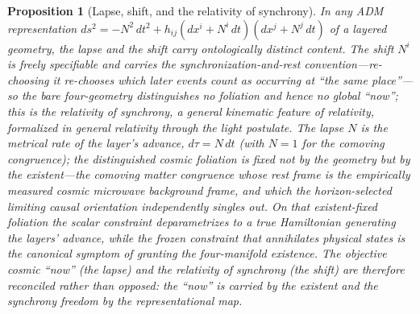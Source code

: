 \documentclass[11pt,a4paper]{article}
\theoremstyle{plain}
\newtheorem{proposition}{Proposition}
\theoremstyle{definition}
\theoremstyle{remark}
\begin{document}
\begin{proposition}[Lapse, shift, and the relativity of synchrony]
In any ADM representation $ds^2=-N^2\,dt^2+h_{ij}(dx^i+N^i\,dt)(dx^j+N^j\,dt)$ of a layered geometry, the lapse and the shift carry ontologically distinct content. The shift $N^i$ is freely specifiable and carries the synchronization-and-rest convention---re-choosing it re-chooses which later events count as occurring at ``the same place''---so the bare four-geometry distinguishes no foliation and hence no global ``now''; this is the relativity of synchrony, a general kinematic feature of relativity, formalized in general relativity through the light postulate. The lapse $N$ is the metrical rate of the layer's advance, $d\tau=N\,dt$ (with $N=1$ for the comoving congruence); the distinguished cosmic foliation is fixed not by the geometry but by the \emph{existent}---the comoving matter congruence whose rest frame is the empirically measured cosmic microwave background frame, and which the horizon-selected limiting causal orientation independently singles out. On that existent-fixed foliation the scalar constraint deparametrizes to a true Hamiltonian generating the layers' advance, while the frozen constraint that annihilates physical states is the canonical symptom of granting the four-manifold existence. The objective cosmic ``now'' (the lapse) and the relativity of synchrony (the shift) are therefore reconciled rather than opposed: the ``now'' is carried by the existent and the synchrony freedom by the representational map.
\end{proposition}
\end{document}
